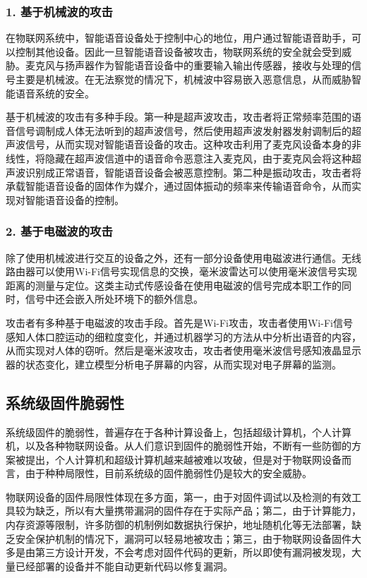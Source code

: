 \subsubsection{\textcolor{myblue}{\textbf{1. 基于机械波的攻击 }}}

在物联网系统中，智能语音设备处于控制中心的地位，用户通过智能语音助手，可以控制其他设备。因此一旦智能语音设备被攻击，物联网系统的安全就会受到威胁。麦克风与扬声器作为智能语音设备中的重要输入输出传感器，接收与处理的信号主要是机械波。在无法察觉的情况下，机械波中容易嵌入恶意信息，从而威胁智能语音系统的安全。

基于机械波的攻击有多种手段。第一种是超声波攻击，攻击者将正常频率范围的语音信号调制成人体无法听到的超声波信号，然后使用超声波发射器发射调制后的超声波信号，从而实现对智能语音设备的攻击。这种攻击利用了麦克风设备本身的非线性，将隐藏在超声波信道中的语音命令恶意注入麦克风，由于麦克风会将这种超声波识别成正常语音，智能语音设备会被恶意控制。第二种是振动攻击，攻击者将承载智能语音设备的固体作为媒介，通过固体振动的频率来传输语音命令，从而实现对智能语音设备的控制。

\subsubsection{\textcolor{myblue}{\textbf{2. 基于电磁波的攻击 }}}
除了使用机械波进行交互的设备之外，还有一部分设备使用电磁波进行通信。无线路由器可以使用Wi-Fi信号实现信息的交换，毫米波雷达可以使用毫米波信号实现距离的测量与定位。这类主动式传感设备在使用电磁波的信号完成本职工作的同时，信号中还会嵌入所处环境下的额外信息。

攻击者有多种基于电磁波的攻击手段。首先是Wi-Fi攻击，攻击者使用Wi-Fi信号感知人体口腔运动的细粒度变化，并通过机器学习的方法从中分析出语音的内容，从而实现对人体的窃听。然后是毫米波攻击，攻击者使用毫米波信号感知液晶显示器的状态变化，建立模型分析电子屏幕的内容，从而实现对电子屏幕的监测。

\subsection{系统级固件脆弱性}
\label{firmware}
系统级固件的脆弱性，普遍存在于各种计算设备上，包括超级计算机，个人计算机，以及各种物联网设备。从人们意识到固件的脆弱性开始，不断有一些防御的方案被提出，个人计算机和超级计算机越来越被难以攻破，但是对于物联网设备而言，由于种种局限性，目前系统级的固件脆弱性仍是较大的安全威胁。

物联网设备的固件局限性体现在多方面，第一，由于对固件调试以及检测的有效工具较为缺乏，所以有大量携带漏洞的固件存在于实际产品；第二，由于计算能力，内存资源等限制，许多防御的机制例如数据执行保护，地址随机化等无法部署，缺乏安全保护机制的情况下，漏洞可以轻易地被攻击；第三，由于物联网设备固件大多是由第三方设计开发，不会考虑对固件代码的更新，所以即使有漏洞被发现，大量已经部署的设备并不能自动更新代码以修复漏洞。

